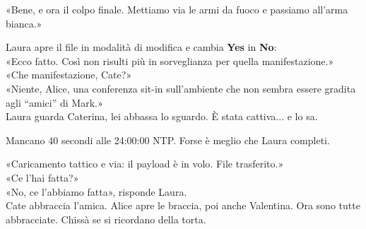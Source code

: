 \separatore
\par\medskip
«Bene, e ora il colpo finale. Mettiamo via le armi da fuoco e passiamo all’arma bianca.»

\par\medskip
Laura apre il file in modalità di modifica e cambia \textbf{Yes} in \textbf{No}:\\
«Ecco fatto. Così non risulti pi\`u in sorveglianza per quella manifestazione.»\\
«Che manifestazione, Cate?»\\
«Niente, Alice, una conferenza sit-in sull’ambiente che non sembra essere gradita agli “amici” di Mark.»\\
Laura guarda Caterina, lei abbassa lo sguardo. \`E stata cattiva... e lo sa.

\par\medskip
Mancano 40 secondi alle 24:00:00 NTP. Forse \`e meglio che Laura completi.

\par\medskip
«Caricamento tattico e via: il payload \`e in volo. File trasferito.»\\
«Ce l’hai fatta?»\\
«No, ce l’abbiamo fatta», risponde Laura.\\
Cate abbraccia l’amica. Alice apre le braccia, poi anche Valentina. Ora sono tutte abbracciate. Chissà se si ricordano della torta.

